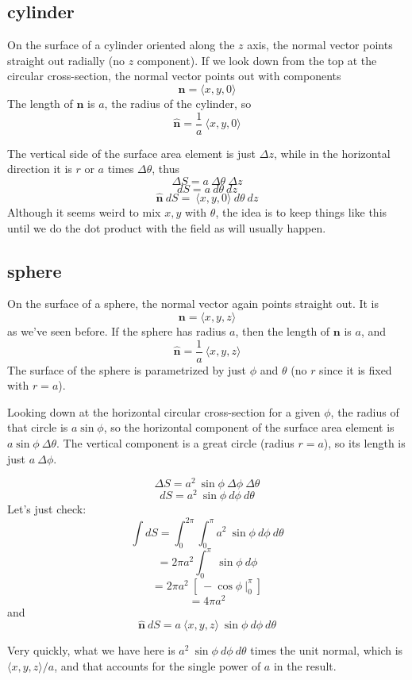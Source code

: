 \documentclass[11pt, oneside]{article}
\begin{document}
\subsection*{cylinder}
On the surface of a cylinder oriented along the $z$ axis, the normal vector points straight out radially (no $z$ component).  If we look down from the top at the circular cross-section, the normal vector points out with components 
\[ \mathbf{n} = \langle x,y,0 \rangle \]
The length of $\mathbf{n}$ is $a$, the radius of the cylinder, so
\[ \hat{\mathbf{n}} = \frac{1}{a} \ \langle x,y,0 \rangle \]

The vertical side of the surface area element is just $\Delta z$, while in the horizontal direction it is $r$ or $a$ times $\Delta \theta$, thus 
\[ \Delta S = a \ \Delta \theta \ \Delta z \]
\[ dS = a \ d \theta \ dz \]
\[ \hat{\mathbf{n}} \ dS = \ \langle x,y,0 \rangle  \ d \theta \ dz \]
Although it seems weird to mix $x,y$ with $\theta$, the idea is to keep things like this until we do the dot product with the field as will usually happen.

\subsection*{sphere}
On the surface of a sphere, the normal vector again points straight out.  It is
\[ \mathbf{n} = \langle x,y,z \rangle \]
as we've seen before.  If the sphere has radius $a$, then the length of $\mathbf{n}$ is $a$, and
\[ \hat{\mathbf{n}} = \frac{1}{a} \ \langle x,y,z \rangle \]
The surface of the sphere is parametrized by just $\phi$ and $\theta$ (no $r$ since it is fixed with $r=a$).  

Looking down at the horizontal circular cross-section for a given $\phi$, the radius of that circle is $a \sin \phi$, so the horizontal component of the surface area element is $a \sin \phi \ \Delta \theta$.  The vertical component is a great circle (radius $r = a$), so its length is just $a \ \Delta \phi$.

\[ \Delta S = a^2 \ \sin \phi \ \Delta \phi \ \Delta \theta \]
\[ dS = a^2 \ \sin \phi \ d \phi \ d \theta \]
Let's just check:
\[ \int dS = \int_0^{2 \pi} \int_0^{\pi} a^2 \ \sin \phi \ d \phi \ d \theta \]
\[ = 2 \pi a^2  \int_0^{\pi} \ \sin \phi \ d \phi \]
\[ = 2 \pi a^2 \ [ \ - \cos \phi  \ \bigg |_0^{\pi} \ ] \]
\[ = 4 \pi a^2 \]
and
\[ \hat{\mathbf{n}} \ dS = a \ \langle x,y,z \rangle   \ \sin \phi \ d \phi \ d \theta \]

Very quickly, what we have here is $a^2 \ \sin \phi \ d \phi \ d \theta$ times the unit normal, which is $ \langle x,y,z \rangle/a$, and that accounts for the single power of $a$ in the result.
\end{document}
